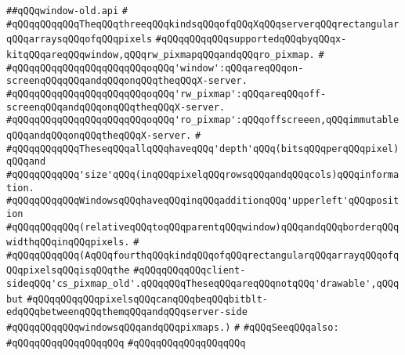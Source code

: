 \label{src/lib/x-kit/xclient/src/window/window-old.api}
\verb|##qQQqwindow-old.api|\newline
\verb|#|\newline
\verb|#qQQqqQQqqQQqTheqQQqthreeqQQqkindsqQQqofqQQqXqQQqserverqQQqrectangularqQQqarraysqQQqofqQQqpixels|\newline
\verb|#qQQqqQQqqQQqsupportedqQQqbyqQQqx-kitqQQqareqQQqwindow,qQQqrw_pixmapqQQqandqQQqro_pixmap.|\newline
\verb|#|\newline
\verb|#qQQqqQQqqQQqqQQqqQQqqQQqoqQQq'window':qQQqareqQQqon-screenqQQqqQQqandqQQqonqQQqtheqQQqX-server.|\newline
\verb|#qQQqqQQqqQQqqQQqqQQqqQQqoqQQq'rw_pixmap':qQQqareqQQqoff-screenqQQqandqQQqonqQQqtheqQQqX-server.|\newline
\verb|#qQQqqQQqqQQqqQQqqQQqqQQqoqQQq'ro_pixmap':qQQqoffscreeen,qQQqimmutableqQQqandqQQqonqQQqtheqQQqX-server.|\newline
\verb|#|\newline
\verb|#qQQqqQQqqQQqTheseqQQqallqQQqhaveqQQq'depth'qQQq(bitsqQQqperqQQqpixel)qQQqand|\newline
\verb|#qQQqqQQqqQQq'size'qQQq(inqQQqpixelqQQqrowsqQQqandqQQqcols)qQQqinformation.|\newline
\verb|#qQQqqQQqqQQqWindowsqQQqhaveqQQqinqQQqadditionqQQq'upperleft'qQQqposition|\newline
\verb|#qQQqqQQqqQQq(relativeqQQqtoqQQqparentqQQqwindow)qQQqandqQQqborderqQQqwidthqQQqinqQQqpixels.|\newline
\verb|#|\newline
\verb|#qQQqqQQqqQQq(AqQQqfourthqQQqkindqQQqofqQQqrectangularqQQqarrayqQQqofqQQqpixelsqQQqisqQQqthe|\newline
\verb|#qQQqqQQqqQQqclient-sideqQQq'cs_pixmap_old'.qQQqqQQqTheseqQQqareqQQqnotqQQq'drawable',qQQqbut|\newline
\verb|#qQQqqQQqqQQqpixelsqQQqcanqQQqbeqQQqbitblt-edqQQqbetweenqQQqthemqQQqandqQQqserver-side|\newline
\verb|#qQQqqQQqqQQqwindowsqQQqandqQQqpixmaps.)|\newline
\verb|#|\newline
\verb|#qQQqSeeqQQqalso:|\newline
\verb|#qQQqqQQqqQQqqQQqqQQq|\newline
\verb|#qQQqqQQqqQQqqQQqqQQq|\newline
